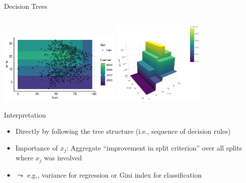 \documentclass[11pt,compress,t,notes=noshow, aspectratio=169, xcolor=table]{beamer}
\begin{document}
\begin{frame}{Decision Trees }
\begin{columns}[T, totalwidth=\textwidth]
\begin{column}{0.35\textwidth}
\end{column}
\end{columns}
\vspace{-0.4cm}
\begin{center}
\includegraphics[width=0.45\textwidth]{figure/tree_surface1.pdf} \qquad  
\includegraphics[width=0.33\textwidth]{figure/tree_surface2.png}
\end{center}

\end{frame}


\begin{frame}{Interpretation}
\begin{itemize}
    \item Directly by following the tree structure (i.e., sequence of decision rules)
    \item Importance of $x_j$: Aggregate ``improvement in split criterion'' over all splits where $x_j$ was involved\\
    \item[] $\leadsto$ e.g., variance for regression or Gini index for classification
\end{itemize}

\end{frame}
\end{document}
